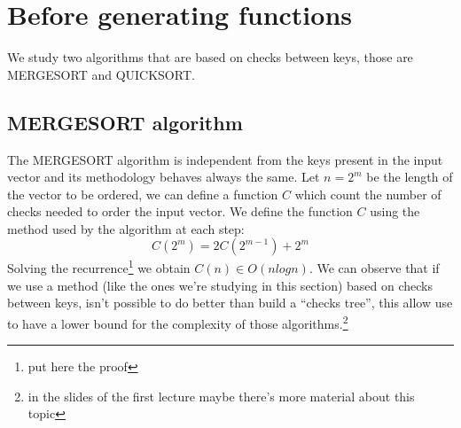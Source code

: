 \section{Before generating functions}

We study two algorithms that are based on checks between keys, those
are MERGESORT and QUICKSORT.

\subsection{MERGESORT algorithm}

The MERGESORT algorithm is independent from the keys present in the
input vector and its methodology behaves always the same. Let $n =
2^m$ be the length of the vector to be ordered, we can define a
function $C$ which count the number of checks needed to order the
input vector. We define the function $C$ using the method used by the
algorithm at each step:
\begin{displaymath}
  C(2^m) = 2C(2^{m-1}) + 2^m
\end{displaymath}
Solving the recurrence\footnote{put here the proof} we obtain $C(n)
\in O(n logn)$. We can observe that if we use a method (like the ones
we're studying in this section) based on checks between keys, isn't
possible to do better than build a ``checks tree'', this allow use to
have a lower bound for the complexity of those algorithms.\footnote{in
  the slides of the first lecture maybe there's more material about
  this topic}

